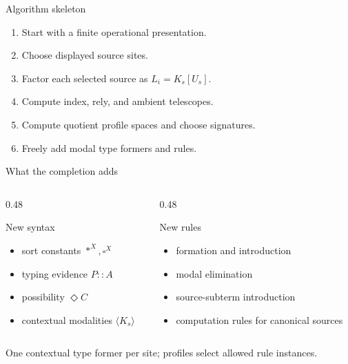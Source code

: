 \documentclass[aspectratio=169,11pt]{beamer}
\newcommand{\ty}{\mathrel{::}}
\newcommand{\Dia}{\Diamond}
\newcommand{\Hyp}{\mathsf{Hyp}}
\begin{document}
\begin{frame}{Algorithm skeleton}
\begin{enumerate}
  \item Start with a finite operational presentation.
  \item Choose displayed source sites.
  \item Factor each selected source as \(L_i=K_s[U_s]\).
  \item Compute index, rely, and ambient telescopes.
  \item Compute quotient profile spaces and choose signatures.
  \item Freely add modal type formers and rules.
\end{enumerate}

\vspace{0.5em}
\begin{center}
\end{center}
\end{frame}

\begin{frame}{What the completion adds}
\begin{columns}[T]
\begin{column}{0.48\textwidth}
\begin{block}{New syntax}
\begin{itemize}
  \item sort constants \(\ast^X,\square^X\)
  \item typing evidence \(P\ty A\)
  \item possibility \(\Dia C\)
  \item contextual modalities \(\langle K_s\rangle\)
\end{itemize}
\end{block}

\end{column}
\begin{column}{0.48\textwidth}
\begin{block}{New rules}
\begin{itemize}
  \item formation and introduction
  \item modal elimination
  \item source-subterm introduction
  \item computation rules for canonical sources
\end{itemize}
\end{block}
\end{column}
\end{columns}

\vspace{0.5em}
One contextual type former per site; profiles select allowed rule instances.
\end{frame}
\end{document}
